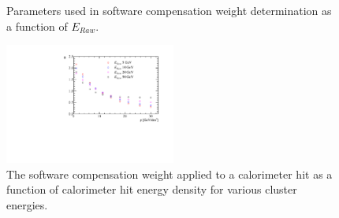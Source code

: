 \begin{figure}[h!]
\caption[Parameters used in software compensation weight determination as a function of $E_{Raw}$.]{Parameters used in software compensation weight determination as a function of $E_{Raw}$.}
\label{fig:softcompparams}
\end{figure}

\begin{figure}[h!]
\includegraphics[width=0.5\textwidth]{EnergyEstimators/Plots/SoftComp/Weights/SoftwareCompensationWeights.pdf}
\caption[The software compensation weight applied to a calorimeter hit as a function of calorimeter hit energy density for various cluster energies.]{The software compensation weight applied to a calorimeter hit as a function of calorimeter hit energy density for various cluster energies.}
\label{fig:softcompweights}
\end{figure}

